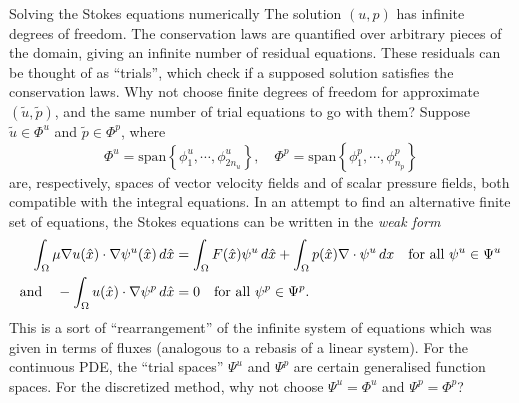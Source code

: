 \documentclass{article}
\begin{document}
\newpage
\vskip 0.2in
{\large Solving the Stokes equations numerically}
\vskip 0.2in
\noindent
The solution {\large $(u,p)$} has infinite degrees of freedom.
The conservation laws are quantified over arbitrary pieces of the domain,
giving an infinite number of residual equations. These residuals can be thought of
as ``trials'', which check if a supposed solution satisfies the conservation laws.
Why not choose finite degrees of freedom for approximate {\large $(\tilde{u}, \tilde{p})$},
and the same number of trial equations to go with them?
Suppose $\tilde{u} \in \Phi^u$ and $\tilde{p} \in \Phi^p$, where
    $$\Phi^u = \text{span}\left\{\phi^u_1,\cdots,\phi^u_{2n_u}\right\},\quad 
        \Phi^p = \text{span}\left\{\phi^p_1,\cdots,\phi^p_{n_p}\right\}$$
are, respectively, spaces of vector velocity fields and of scalar pressure fields, both compatible with the integral equations.
In an attempt to find an alternative finite set of equations, the Stokes equations can be written in the \textit{weak form}
\begin{equation}\label{steady_stokes_weak_form}
\begin{split}
        \int_{\Omega} \mu\nabla u(\hat{x})\cdot \nabla\psi^u(\hat{x})\,d\hat{x}
            &= \int_{\Omega}F(\hat{x})\psi^u\,d\hat{x}
            +\int_{\Omega} p(\hat{x})\nabla\cdot\psi^u\,dx \text{\quad for all $\psi^u \in \Psi^u$}\\
    \text{and\quad} -\int_{\Omega}u(\hat{x})\cdot\nabla\psi^p\,d\hat{x} &= 0 \text{\quad for all $\psi^p \in \Psi^p$}.
\end{split}
\end{equation}
This is a sort of ``rearrangement'' of the infinite system of equations which was given in terms of fluxes
(analogous to a rebasis of a linear system).
For the continuous PDE, the ``trial spaces'' $\Psi^u$ and $\Psi^p$ are certain generalised function spaces.
For the discretized method, why not choose $\Psi^u = \Phi^u$ and $\Psi^p = \Phi^p$?
\end{document}
